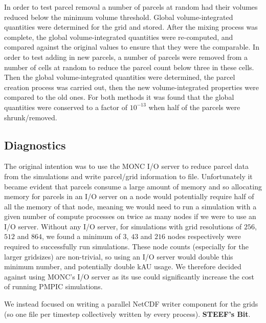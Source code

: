 \documentclass{article}
\begin{document}
In order to test parcel removal a number of parcels at random had their volumes reduced below the minimum volume threshold. Global volume-integrated quantities were determined for the grid and stored. After the mixing process was complete, the global volume-integrated quantities were re-computed, and compared against the original values to ensure that they were the comparable. In order to test adding in new parcels, a number of parcels were removed from a number of cells at random to reduce the parcel count below three in these cells. Then the global volume-integrated quantities were determined, the parcel creation process was carried out, then the new volume-integrated properties were compared to the old ones. For both methods it was found that the global quantities were conserved to a factor of $10^{-13}$ when half of the parcels were shrunk/removed.


\subsection{Diagnostics}
The original intention was to use the MONC I/O server to reduce parcel data from the simulations and write parcel/grid information to file. Unfortunately it became evident that parcels consume a large amount of memory and so allocating memory for parcels in an I/O server on a node would potentially require half of all the memory of that node, meaning we would need to run a simulation with a given number of compute processes on twice as many nodes if we were to use an I/O server. Without any I/O server, for simulations with grid resolutions of $256$, $512$ and $864$, we found a minimum of $3$, $43$ and $216$ nodes respectively were required to successfully run simulations. These node counts (especially for the larger gridsizes) are non-trivial, so using an I/O server would double this minimum number, and potentially double kAU usage. We therefore decided against using MONC's I/O server as its use could significantly increase the cost of running PMPIC simulations.

We instead focused on writing a parallel NetCDF writer component for the grids (so one file per timestep collectively written by every process). \textbf{STEEF's Bit}.
\end{document}
